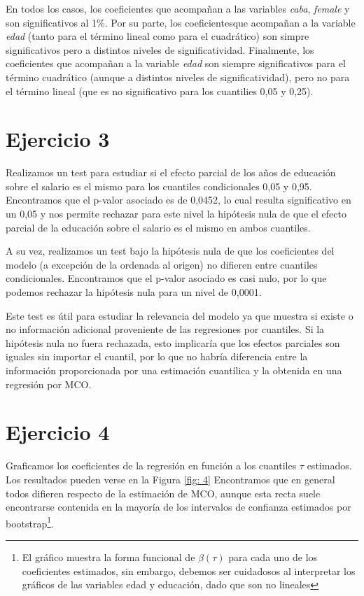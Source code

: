 \documentclass[11pt]{article}
\begin{document}
En todos los casos, los coeficientes que acompañan a las variables \emph{caba}, \emph{female} y son significativos al 1\%. Por su parte, los coeficientesque acompañan a la variable \emph{edad} (tanto para el término lineal como para el cuadrático) son simpre significativos pero a distintos niveles de significatividad. Finalmente, los coeficientes que acompañan a la variable \emph{edad} son siempre significativos para el término cuadrático (aunque a distintos niveles de significatividad), pero no para el término lineal (que es no significativo para los cuantilies 0,05 y 0,25). 

\section*{Ejercicio 3}

Realizamos un test para estudiar si el efecto parcial de los años de educación sobre el salario es el mismo para los cuantiles condicionales 0,05 y 0,95. Encontramos que el p-valor asociado es de 0,0452, lo cual resulta significativo en un 0,05 y nos permite rechazar para este nivel la hipótesis nula de que el efecto parcial de la educación sobre el salario es el mismo en ambos cuantiles.

A su vez, realizamos un test bajo la hipótesis nula de que los coeficientes del modelo (a excepción de la ordenada al origen) no difieren entre cuantiles condicionales. Encontramos que el p-valor asociado es casi nulo, por lo que podemos rechazar la hipótesis nula para un nivel de 0,0001. 

Este test es útil para estudiar la relevancia del modelo ya que muestra si existe o no información adicional proveniente de las regresiones por cuantiles. Si la hipótesis nula no fuera rechazada, esto implicaría que los efectos parciales son iguales sin importar el cuantil, por lo que no habría diferencia entre la información proporcionada por una estimación cuantílica y la obtenida en una regresión por MCO.

\section*{Ejercicio 4}

Graficamos los coeficientes de la regresión en función a los cuantiles $\tau$ estimados. Los resultados pueden verse en la Figura \ref{fig: 4} Encontramos que en general todos difieren respecto de la estimación de MCO, aunque esta recta suele encontrarse contenida en la mayoría de los intervalos de confianza estimados por bootstrap\footnote{El gráfico muestra la forma funcional de $\beta(\tau)$ para cada uno de los coeficientes estimados, sin embargo, debemos ser cuidadosos al interpretar los gráficos de las variables edad y educación, dado que son no lineales}.  
\end{document}

